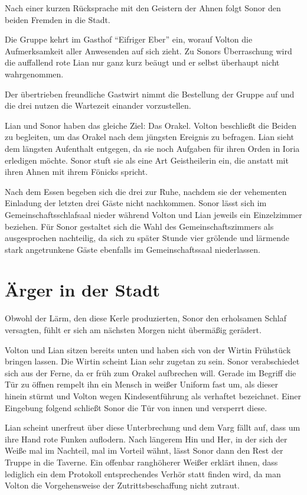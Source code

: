 Nach einer kurzen Rücksprache mit den Geistern der Ahnen folgt Sonor den beiden Fremden in die Stadt.


Die Gruppe kehrt im Gasthof \enquote{Eifriger Eber} ein, worauf Volton die Aufmerksamkeit aller Anwesenden auf sich zieht. Zu Sonors Überraschung wird die auffallend rote Lian nur ganz kurz beäugt und er selbst überhaupt nicht wahrgenommen.

Der übertrieben freundliche Gastwirt nimmt die Bestellung der Gruppe auf und die drei nutzen die Wartezeit einander vorzustellen.

Lian und Sonor haben das gleiche Ziel: Das Orakel. Volton beschließt die Beiden zu begleiten, um das Orakel nach dem jüngsten Ereignis zu befragen.
Lian sieht dem längsten Aufenthalt entgegen, da sie noch Aufgaben für ihren Orden in Ioria erledigen möchte.
Sonor stuft sie als eine Art Geistheilerin ein, die anstatt mit ihren Ahnen mit ihrem Fönicks spricht. 

Nach dem Essen begeben sich die drei zur Ruhe, nachdem sie der vehementen Einladung der letzten drei Gäste nicht nachkommen.
Sonor lässt sich im Gemeinschaftsschlafsaal nieder während Volton und Lian jeweils ein Einzelzimmer beziehen.
Für Sonor gestaltet sich die Wahl des Gemeinschaftszimmers als ausgesprochen nachteilig, da sich zu später Stunde vier grölende und lärmende stark angetrunkene Gäste ebenfalls im Gemeinschaftssaal niederlassen.

\section{Ärger in der Stadt}

Obwohl der Lärm, den diese Kerle produzierten, Sonor den erholsamen Schlaf versagten, fühlt er sich am nächsten Morgen nicht übermäßig gerädert.

Volton und Lian sitzen bereits unten und haben sich von der Wirtin Frühstück bringen lassen. Die Wirtin scheint Lian sehr zugetan zu sein. Sonor verabschiedet sich aus der Ferne, da er früh zum Orakel aufbrechen will. Gerade im Begriff die Tür zu öffnen rempelt ihn ein Mensch in weißer Uniform fast um, als dieser hinein stürmt und Volton wegen Kindesentführung als verhaftet bezeichnet.
Einer Eingebung folgend schließt Sonor die Tür von innen und versperrt diese.

Lian scheint unerfreut über diese Unterbrechung und dem Varg fällt auf, dass um ihre Hand rote Funken auflodern.
Nach längerem Hin und Her, in der sich der Weiße mal im Nachteil, mal im Vorteil wähnt, lässt Sonor dann den Rest der Truppe in die Taverne.
Ein offenbar ranghöherer Weißer erklärt ihnen, dass lediglich ein dem Protokoll entsprechendes Verhör statt finden wird, da man Volton die Vorgehensweise der Zutrittsbeschaffung nicht zutraut.


